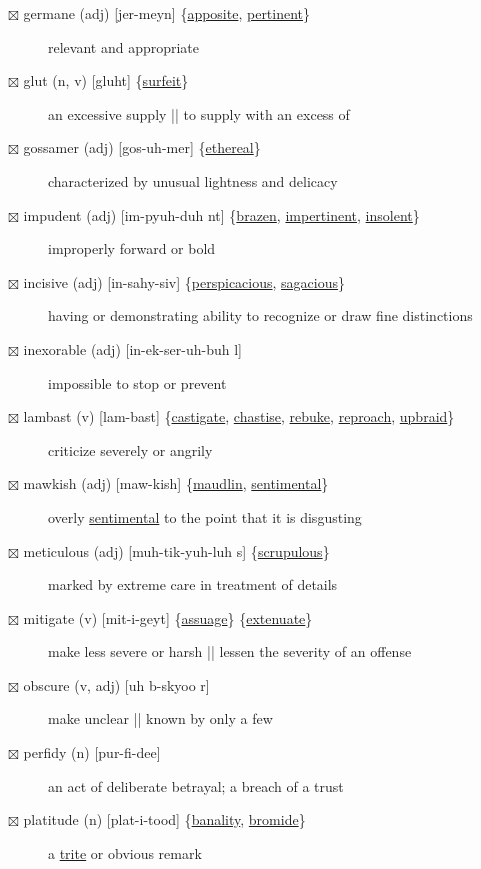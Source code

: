\documentclass[11pt]{article}
\begin{document}
\begin{description}
\item[{$\boxtimes$ \label{orgde699fa}germane (adj) [jer-meyn] \{\hyperref[org609a5a6]{apposite}, \hyperref[org93638fe]{pertinent}\}}] relevant and appropriate
\item[{$\boxtimes$ \label{orgba662a0} \label{org1711d42}glut (n, v) [gluht] \{\hyperref[org9af0aa5]{surfeit}\}}] an excessive supply || to supply with an excess of
\item[{$\boxtimes$ \label{org373c447}gossamer (adj) [gos-uh-mer] \{\hyperref[org810ca77]{ethereal}\}}] characterized by unusual lightness and delicacy
\item[{$\boxtimes$ \label{orgdac3101}impudent (adj) [im-pyuh-duh nt] \{\hyperref[orga7c2142]{brazen}, \hyperref[org66b257e]{impertinent}, \hyperref[org7d4233d]{insolent}\}}] improperly forward or bold
\item[{$\boxtimes$ \label{org090905a}incisive (adj) [in-sahy-siv] \{\hyperref[orgff18213]{perspicacious}, \hyperref[org9352a5d]{sagacious}\}}] having or demonstrating ability to recognize or draw fine distinctions
\item[{$\boxtimes$ inexorable (adj) [in-ek-ser-uh-buh l]}] impossible to stop or prevent
\item[{$\boxtimes$ \label{orgcb82180}lambast (v) [lam-bast] \{\hyperref[org41ed9c5]{castigate}, \hyperref[org578f0de]{chastise}, \hyperref[org05472f9]{rebuke}, \hyperref[org3cb95b6]{reproach}, \hyperref[org6b90e9e]{upbraid}\}}] criticize severely or angrily
\item[{$\boxtimes$ \label{org0099c38}mawkish (adj) [maw-kish] \{\hyperref[org4160f55]{maudlin}, \hyperref[org452b84f]{sentimental}\}}] overly \hyperref[org452b84f]{sentimental} to the point that it is disgusting
\item[{$\boxtimes$ \label{org2af80b4}meticulous (adj) [muh-tik-yuh-luh s] \{\hyperref[org0389c61]{scrupulous}\}}] marked by extreme care in treatment of details
\item[{$\boxtimes$ \label{org8400f8e}mitigate (v) [mit-i-geyt] \{\hyperref[org70bdfd2]{assuage}\} \{\hyperref[org94911d6]{extenuate}\}}] make less severe or harsh || lessen the severity of an offense
\item[{$\boxtimes$ \label{org680c7eb}obscure (v, adj) [uh b-skyoo r]}] make unclear || known by only a few
\item[{$\boxtimes$ \label{org7ac1415} perfidy (n) [pur-fi-dee]}] an act of deliberate betrayal; a breach of a trust
\item[{$\boxtimes$ \label{org953e432}platitude (n) [plat-i-tood] \{\hyperref[orga4de2d2]{banality}, \hyperref[org73365c5]{bromide}\}}] a \hyperref[org91e02d4]{trite} or obvious remark

\end{description}
\end{document}
